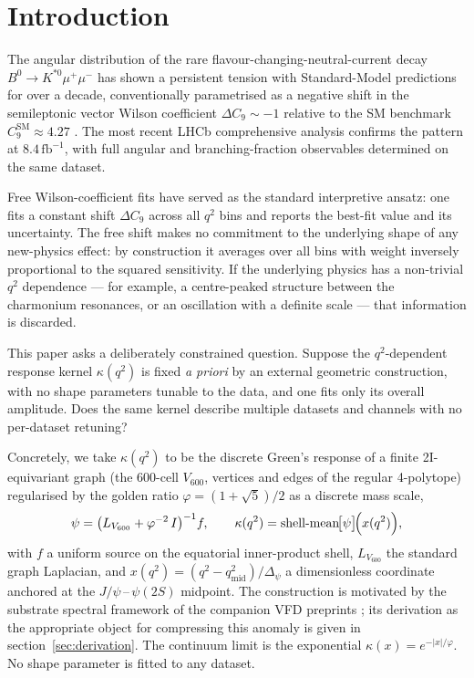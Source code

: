 \section{Introduction}\label{sec:intro}

The angular distribution of the rare flavour-changing-neutral-current
decay $B^{0}\to K^{*0}\mu^{+}\mu^{-}$ has shown a persistent tension
with Standard-Model predictions for over a decade, conventionally
parametrised as a negative shift in the semileptonic vector Wilson
coefficient $\Delta C_{9}\sim -1$ relative to the SM benchmark
$C_{9}^{\mathrm{SM}}\approx 4.27$
\citep{Descotes2013P5p,AltmannshoferStraub2013}. The most recent LHCb
comprehensive analysis \citep{LHCb2025BKstmumuComp,LHCb2025BKstmumuHEPData}
confirms the pattern at $8.4\,\mathrm{fb}^{-1}$, with full angular and
branching-fraction observables determined on the same dataset.

Free Wilson-coefficient fits have served as the standard interpretive
ansatz: one fits a constant shift $\Delta C_{9}$ across all $q^{2}$ bins
and reports the best-fit value and its uncertainty. The free shift makes
no commitment to the underlying shape of any new-physics effect: by
construction it averages over all bins with weight inversely proportional
to the squared sensitivity. If the underlying physics has a non-trivial
$q^{2}$ dependence — for example, a centre-peaked structure between the
charmonium resonances, or an oscillation with a definite scale — that
information is discarded.

This paper asks a deliberately constrained question. Suppose the
$q^{2}$-dependent response kernel $\kappa(q^{2})$ is fixed
\emph{a priori} by an external geometric construction, with no shape
parameters tunable to the data, and one fits only its overall
amplitude. Does the same kernel describe multiple datasets and channels
with no per-dataset retuning?

Concretely, we take $\kappa(q^{2})$ to be the discrete Green's response
of a finite 2I-equivariant graph (the 600-cell $V_{600}$, vertices and
edges of the regular 4-polytope) regularised by the golden ratio
$\varphi=(1+\sqrt{5})/2$ as a discrete mass scale,
\begin{equation}\label{eq:kernel_def}
\psi = \bigl(L_{V_{600}} + \varphi^{-2}\, I\bigr)^{-1} f,
\qquad
\kappa(q^{2}) = \mathrm{shell\text{-}mean}\!\bigl[\psi\bigr]\!\Bigl(x(q^{2})\Bigr),
\end{equation}
with $f$ a uniform source on the equatorial inner-product shell,
$L_{V_{600}}$ the standard graph Laplacian, and $x(q^{2}) =
(q^{2}-q^{2}_{\mathrm{mid}})/\Delta_{\psi}$ a dimensionless coordinate
anchored at the $J/\psi$\,--\,$\psi(2S)$ midpoint. The construction is
motivated by the substrate spectral framework of the companion VFD
preprints \citep{SmartCrystallisation2026,SmartAdaptiveClosureTransport2026};
its derivation as the appropriate object for compressing this anomaly
is given in section~\ref{sec:derivation}. The continuum limit is the
exponential $\kappa(x) = e^{-|x|/\varphi}$. No shape parameter is
fitted to any dataset.

